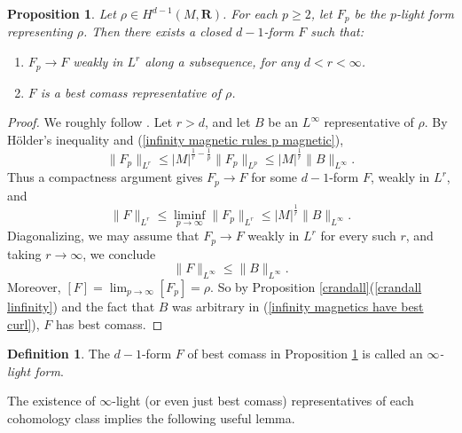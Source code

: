 \documentclass[reqno,11pt]{amsart}
\newcommand{\RR}{\mathbf{R}}
\newcommand{\dfn}[1]{\emph{#1}\index{#1}}
\newtheorem{proposition}[theorem]{Proposition}
\theoremstyle{definition}
\newtheorem{definition}[theorem]{Definition}
\numberwithin{equation}{section}
\begin{document}
\begin{proposition}\label{existence infinity}
Let $\rho \in H^{d - 1}(M, \RR)$.
For each $p \geq 2$, let $F_p$ be the $p$-light form representing $\rho$. Then there exists a closed $d - 1$-form $F$ such that:
\begin{enumerate}
\item $F_p \to F$ weakly in $L^r$ along a subsequence, for any $d < r < \infty$.
\item $F$ is a best comass representative of $\rho$.
\end{enumerate}
\end{proposition}
\begin{proof}
We roughly follow \cite[\S3]{Lindqvist14}.
Let $r > d$, and let $B$ be an $L^\infty$ representative of $\rho$.
By H\"older's inequality and (\ref{infinity magnetic rules p magnetic}),
\begin{equation}\label{uniform bounds in p by best curl}
	\|F_p\|_{L^r} \leq |M|^{\frac{1}{r} - \frac{1}{p}} \|F_p\|_{L^p} \leq |M|^{\frac{1}{r}} \|B\|_{L^\infty}.
\end{equation}
Thus a compactness argument gives $F_p \to F$ for some $d - 1$-form $F$, weakly in $L^r$, and 
$$\|F\|_{L^r} \leq \liminf_{p \to \infty} \|F_p\|_{L^r} \leq |M|^{\frac{1}{r}} \|B\|_{L^\infty}.$$
Diagonalizing, we may assume that $F_p \to F$ weakly in $L^r$ for every such $r$, and taking $r \to \infty$, we conclude 
\begin{equation}\label{infinity magnetics have best curl}
	\|F\|_{L^\infty} \leq \|B\|_{L^\infty}.
\end{equation}
Moreover, $[F] = \lim_{p \to \infty} [F_p] = \rho$.
So by Proposition \ref{crandall}(\ref{crandall linfinity}) and the fact that $B$ was arbitrary in (\ref{infinity magnetics have best curl}), $F$ has best comass.
\end{proof}

\begin{definition}
The $d - 1$-form $F$ of best comass in Proposition \ref{existence infinity} is called an \dfn{$\infty$-light form}.
\end{definition}

The existence of $\infty$-light (or even just best comass) representatives of each cohomology class implies the following useful lemma.
\end{document}
